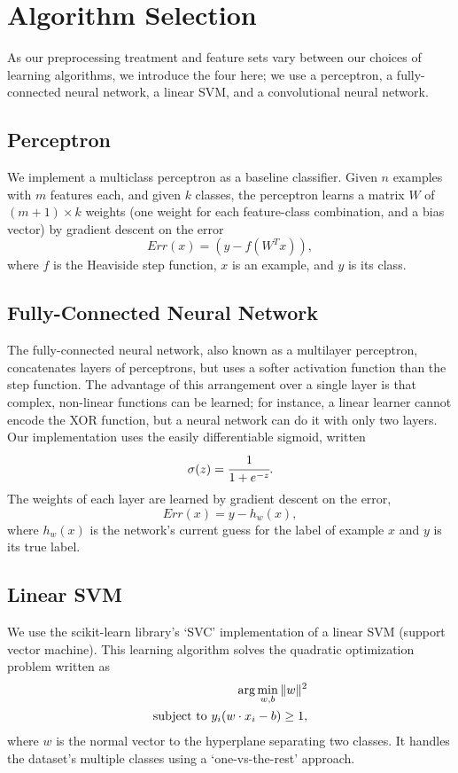 \documentclass{acm_proc_article-sp}
\begin{document}
\section{Algorithm Selection}%
As our preprocessing treatment and feature sets vary between our choices of learning algorithms, we introduce the four here; we use a perceptron, a fully-connected neural network, a linear SVM, and a convolutional neural network.

\subsection{Perceptron}
We implement a multiclass perceptron as a baseline classifier. Given $n$ examples with $m$ features each, and given $k$ classes, the perceptron learns a matrix $W$ of $(m+1) \times k$ weights (one weight for each feature-class combination, and a bias vector) by gradient descent on the error $$Err(x) = (y - f(W^Tx)),$$
where $f$ is the Heaviside step function, $x$ is an example, and $y$ is its class.

\subsection{Fully-Connected Neural Network}
The fully-connected neural network, also known as a multilayer perceptron, concatenates layers of perceptrons, but uses a softer activation function than the step function. The advantage of this arrangement over a single layer is that complex, non-linear functions can be learned; for instance, a linear learner cannot encode the XOR function, but a neural network can do it with only two layers. Our implementation uses the easily differentiable sigmoid, written $$\sigma(z) = \cfrac{1}{1 + e^{-z}}.$$ The weights of each layer are learned by gradient descent on the error, $$Err(x) = y - h_w(x),$$ where $h_w(x)$ is the network's current guess for the label of example $x$ and $y$ is its true label.

\subsection{Linear SVM}
We use the scikit-learn \cite{scikit-learn} library's `SVC' implementation of a linear SVM (support vector machine). This learning algorithm solves the quadratic optimization problem written as
\begin{align*} 
\hbox{arg} \min_{w,b} \|w\|^2 \\
\hbox{subject to } y_i(w \cdot x_i - b) \geq 1,
\end{align*}
where $w$ is the normal vector to the hyperplane separating two classes. It handles the dataset's multiple classes using a `one-vs-the-rest' approach.
\end{document}
